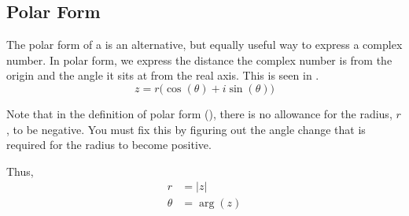 \subsection{Polar Form}\label{subsec:Polar_Form}
The polar form of a  is an alternative, but equally useful way to express a complex number.
In polar form, we express the distance the complex number is from the origin and the angle it sits at from the real axis.
This is seen in .
\begin{equation}\label{eq:Polar_Form}
  z = r \bigl( \cos(\theta) + i \sin(\theta) \bigr)
\end{equation}

\begin{remark*}
  Note that in the definition of polar form (), there is no allowance for the radius, $r$, to be negative.
  You must fix this by figuring out the angle change that is required for the radius to become positive.
\end{remark*}

Thus,
\begin{align*}
  r &= \lvert z \rvert \\
  \theta &= \arg(z) \\
\end{align*}

